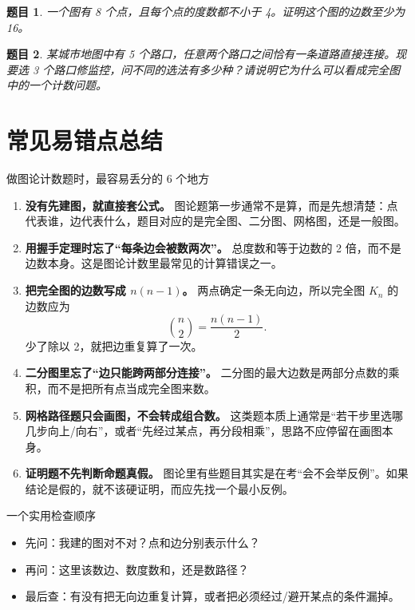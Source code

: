 \documentclass[11pt,a4paper,fontset=fandol]{ctexart}
\theoremstyle{formalexample}
\newtheorem{exercise}{题目}[section]
\begin{document}
\begin{exercise}
一个图有 8 个点，且每个点的度数都不小于 4。证明这个图的边数至少为 16。
\end{exercise}

\begin{exercise}
某城市地图中有 5 个路口，任意两个路口之间恰有一条道路直接连接。现要选 3 个路口修监控，问不同的选法有多少种？请说明它为什么可以看成完全图中的一个计数问题。
\end{exercise}

\newpage
\section{常见易错点总结}

\begin{goalbox}{做图论计数题时，最容易丢分的 6 个地方}
\begin{enumerate}
  \item \textbf{没有先建图，就直接套公式。}  
  图论题第一步通常不是算，而是先想清楚：点代表谁，边代表什么，题目对应的是完全图、二分图、网格图，还是一般图。

  \item \textbf{用握手定理时忘了“每条边会被数两次”。}  
  总度数和等于边数的 2 倍，而不是边数本身。这是图论计数里最常见的计算错误之一。

  \item \textbf{把完全图的边数写成 $n(n-1)$。}  
  两点确定一条无向边，所以完全图 $K_n$ 的边数应为
  \[
  \binom{n}{2}=\frac{n(n-1)}{2}.
  \]
  少了除以 2，就把边重复算了一次。

  \item \textbf{二分图里忘了“边只能跨两部分连接”。}  
  二分图的最大边数是两部分点数的乘积，而不是把所有点当成完全图来数。

  \item \textbf{网格路径题只会画图，不会转成组合数。}  
  这类题本质上通常是“若干步里选哪几步向上/向右”，或者“先经过某点，再分段相乘”，思路不应停留在画图本身。

  \item \textbf{证明题不先判断命题真假。}  
  图论里有些题目其实是在考“会不会举反例”。如果结论是假的，就不该硬证明，而应先找一个最小反例。
\end{enumerate}
\end{goalbox}

\begin{notebox}{一个实用检查顺序}
\begin{itemize}
  \item 先问：我建的图对不对？点和边分别表示什么？
  \item 再问：这里该数边、数度数和，还是数路径？
  \item 最后查：有没有把无向边重复计算，或者把必须经过/避开某点的条件漏掉。
\end{itemize}
\end{notebox}
\end{document}
